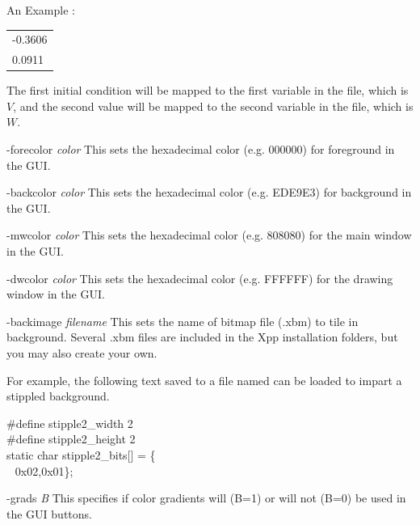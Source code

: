 \begin{description}
\begin{center}
\begin{minipage}{55ex}
\begin{center}An Example {}:
\end{center}\ttfamily
\begin{tabular}{l}
-0.3606\\
0.0911 \\
\end{tabular}
\end{minipage}
\end{center}
The first initial condition will be mapped to the first variable in the {} file, which is $V$, and the second value will be mapped to the second variable in the {} file, which is $W$. 
\item{-forecolor \emph{color}} This sets the hexadecimal color (e.g. 000000) for foreground in the GUI.
\item{-backcolor \emph{color}} This sets the hexadecimal color (e.g. EDE9E3) for background in the GUI.
\item{-mwcolor \emph{color}} This sets the hexadecimal color (e.g. 808080) for the main window in the GUI.
\item{-dwcolor \emph{color}} This sets the hexadecimal color (e.g. FFFFFF) for the drawing window in the GUI.
\item{-backimage \emph{filename}} This sets the name of bitmap file (.xbm) to tile in background. Several .xbm files are included 
in the Xpp installation folders, but you may also create your own. 
\begin{center}\begin{minipage}{65ex}
For example, the following text saved to a file named {}
can be loaded to impart a stippled background.
\begin{center}\ttfamily\begin{minipage}{40ex}
\#define stipple2\_width 2 \\
\#define stipple2\_height 2 \\
static char stipple2\_bits[] = \{ \\
$~~$ 0x02,0x01\};
\end{minipage}\end{center}
\end{minipage}\end{center}
\item{-grads \emph{B}} This specifies if color gradients will (B=1) or will not (B=0) be used in the GUI buttons.

\end{description}
